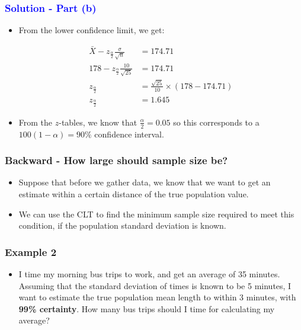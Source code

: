 \documentclass[12pt]{beamer}
\begin{document}
\begin{frame}
	\frametitle{\textcolor{blue}{Solution - Part (b)}}
	
	\begin{itemize}[label={\color{blue}$\blacktriangleright$}]
		\item From the lower confidence limit, we get:
		
		
		\begin{align*}
			\bar{X} - z_{\frac{\alpha}{2}}\frac{\sigma}{\sqrt{n}} &= 174.71 \\
			178 - z_{\frac{\alpha}{2}}\frac{10}{\sqrt{25}} &= 174.71 \\
			z_{\frac{\alpha}{2}} &= \frac{\sqrt{25}}{10} \times (178 - 174.71) \\
			z_{\frac{\alpha}{2}} &= 1.645
		\end{align*}
		
		
		\item From the $z$-tables, we know that $\frac{\alpha}{2} = 0.05$ so this corresponds to a $100(1 - \alpha) = 90\%$ confidence interval.
	\end{itemize}
	
\end{frame}
\begin{frame}
	\frametitle{Backward - How large should sample size be?}
	\begin{itemize}[label={\color{blue}$\blacktriangleright$}]
		\item Suppose that before we gather data, we know that we want to get an estimate within a certain distance of the true population value.
		\item We can use the CLT to find the minimum sample size required to meet this condition, if the population standard deviation is known.
		
	\end{itemize}
	
\end{frame}
\begin{frame}
	\frametitle{Example 2}
	\begin{itemize}[label={\color{blue}$\blacktriangleright$}]
		\item I time my morning bus trips to work, and get an average of 35 minutes. Assuming that the standard deviation of times is known to be 5 minutes, I want to estimate the true population mean length to within 3 minutes, with {\bf 99\% certainty}. How many bus trips should I time for calculating my average?
		
	\end{itemize}
	
\end{frame}
\end{document}
